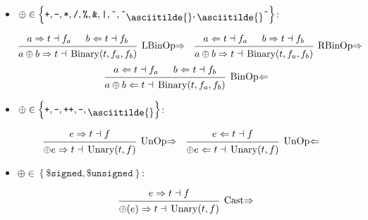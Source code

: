 \documentclass{article}
\DeclareMathOperator{\Binary}{Binary}
\DeclareMathOperator{\Unary}{Unary}
\newcommand{\mytilde}{\raisebox{-.7ex}{\asciitilde{}}}
\newcommand{\binOp}{\ensuremath{\left\{
      \texttt{+}, \texttt{-}, \texttt{*}, \texttt{/}, \texttt{\%}, \texttt{\&},
      \texttt{|}, \texttt{\^{}}, \texttt{\^{}}\mytilde, \mytilde\texttt{\^{}}
      \right\}}}
\newcommand{\unOp}{\ensuremath{\left\{
      \texttt{+}, \texttt{-}, \texttt{++}, \texttt{--}, \mytilde
    \right\}}}
\newcommand{\cast}{\ensuremath{\left\{\texttt{\$signed}, \texttt{\$unsigned}\right\}}}
\renewcommand{\S}{\ensuremath{\Rightarrow}}
\newcommand{\C}{\ensuremath{\Leftarrow}}
\newcommand{\s}[3]{#1 \S{} #2 \dashv{} #3}
\renewcommand{\c}[3]{#1 \C{} #2 \dashv{} #3}
\begin{document}
\begin{itemize}[leftmargin=*]
    \setlength{\itemsep}{2em}

    \item $\oplus \in \binOp$:

          \begin{align*}
               &
              \begin{prooftree}
                  \hypo{\s{a}{t}{f_a}}
                  \hypo{\c{b}{t}{f_b}}
                  \infer2[LBinOp\S]{\s{a\oplus b}{t}{\Binary(t, f_a, f_b)}}
              \end{prooftree}
               &
               &
              \begin{prooftree}
                  \hypo{\c{a}{t}{f_a}}
                  \hypo{\s{b}{t}{f_b}}
                  \infer2[RBinOp\S]{\s{a\oplus b}{t}{\Binary(t, f_a, f_b)}}
              \end{prooftree}
          \end{align*}
          \vspace*{.5em}
          \begin{equation*}
              \begin{prooftree}
                  \hypo{\c{a}{t}{f_a}}
                  \hypo{\c{b}{t}{f_b}}
                  \infer2[BinOp\C]{\c{a\oplus b}{t}{\Binary(t, f_a, f_b)}}
              \end{prooftree}
          \end{equation*}

    \item $\oplus \in \unOp$:

          \begin{align*}
               &
              \begin{prooftree}
                  \hypo{\s{e}{t}{f}}
                  \infer1[UnOp\S]{\s{\oplus e}{t}{\Unary(t, f)}}
              \end{prooftree}
               &
               &
              \begin{prooftree}
                  \hypo{\c{e}{t}{f}}
                  \infer1[UnOp\C]{\c{\oplus e}{t}{\Unary(t, f)}}
              \end{prooftree}
          \end{align*}

    \item $\oplus \in \cast$:

          \begin{equation*}
              \begin{prooftree}
                  \hypo{\s{e}{t}{f}}
                  \infer1[Cast\S]{\s{\oplus(e)}{t}{\Unary(t, f)}}
              \end{prooftree}
          \end{equation*}


\end{itemize}
\end{document}
